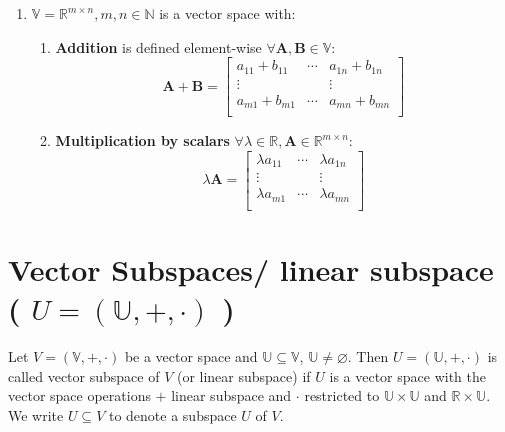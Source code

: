 \begin{enumerate}[itemsep=0.2cm]
\begin{enumerate}
    \end{enumerate}

    \item $\mathbb{V} = \mathbb{R}^{m\times n}, m, n \in \mathbb{N}$ is a vector space with:
    \begin{enumerate}
        \item \textbf{Addition} is defined element-wise $\forall \mathbf{A, B} \in \mathbb{V}$: 
        \[
            \mathbf{A + B} = \begin{bmatrix}
                a_{11} + b_{11} & \cdots & a_{1n} + b_{1n} \\
                \vdots & & \vdots \\
                a_{m1} + b_{m1} & \cdots & a_{mn} + b_{mn} \\
            \end{bmatrix}
        \]

        \item \textbf{Multiplication by scalars} $\forall \lambda\in\mathbb{R}, \mathbf{A}\in\mathbb{R}^{m\times n}$:
        \[
            \lambda\mathbf{A} = \begin{bmatrix}
                \lambda a_{11} & \cdots & \lambda a_{1n} \\
                \vdots & & \vdots \\
                \lambda a_{m1} & \cdots & \lambda a_{mn} \\
            \end{bmatrix}
        \]
    \end{enumerate}


\end{enumerate}













\section{Vector Subspaces/ linear subspace ( $U = (\mathbb{U}, +, \cdot)$ ) \cite{mfml-1}}\label{Vector Subspaces/ linear subspace}
Let $V = (\mathbb{V}, +, \cdot)$ be a vector space and $\mathbb{U} \subseteq \mathbb{V}$, $\mathbb{U} \neq \varnothing$. Then $U = (\mathbb{U}, +, \cdot)$ is called vector subspace of $V$ (or linear subspace) if $U$ is a vector space with the vector space operations $+$ linear subspace and $\cdot$ restricted to $\mathbb{U} \times \mathbb{U}$ and $\mathbb{R} \times \mathbb{U}$. We write $U \subseteq V$ to denote a subspace $U$ of $V$.

